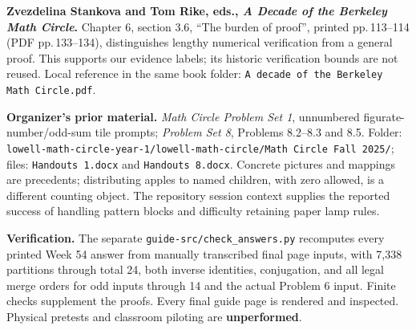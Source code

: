\documentclass[letterpaper,11pt]{article}
\begin{document}
\textbf{Zvezdelina Stankova and Tom Rike, eds., \emph{A Decade of the Berkeley Math Circle}.} Chapter 6, section 3.6, ``The burden of proof'', printed pp.\,113--114 (PDF pp.\,133--134), distinguishes lengthy numerical verification from a general proof. This supports our evidence labels; its historic verification bounds are not reused. Local reference in the same book folder: \texttt{A decade of the Berkeley Math Circle.pdf}.

\textbf{Organizer's prior material.} \emph{Math Circle Problem Set 1}, unnumbered figurate-number/odd-sum tile prompts; \emph{Problem Set 8}, Problems 8.2--8.3 and 8.5. Folder: \nolinkurl{lowell-math-circle-year-1/lowell-math-circle/}\newline\texttt{Math Circle Fall 2025/}; files: \texttt{Handouts 1.docx} and \texttt{Handouts 8.docx}. Concrete pictures and mappings are precedents; distributing apples to named children, with zero allowed, is a different counting object. The repository session context supplies the reported success of handling pattern blocks and difficulty retaining paper lamp rules. 

\textbf{Verification.} The separate \texttt{guide-src/check\_answers.py} recomputes every printed Week 54 answer from manually transcribed final page inputs, with 7,338 partitions through total 24, both inverse identities, conjugation, and all legal merge orders for odd inputs through 14 and the actual Problem 6 input. Finite checks supplement the proofs. Every final guide page is rendered and inspected. Physical pretests and classroom piloting are \textbf{unperformed}.
\end{document}
